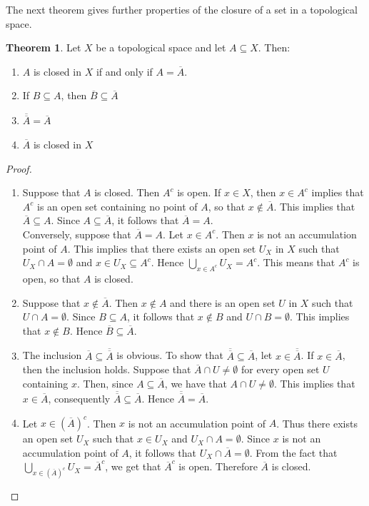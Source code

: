 \documentclass[11pt,a4paper]{article}
\theoremstyle{definition}
\newtheorem{thm}{Theorem}[subsection]
\begin{document}
The next theorem gives further properties of the closure of a set in a topological space.




\begin{thm}
Let $X$ be a topological space and let $A\subseteq X$. Then:
\begin{enumerate}
\item[a.] $A$ is closed in $X$ if and only if $A=\overline{A}$.
\item[b.] If $B\subseteq A$, then $\overline{B}\subseteq \overline{A}$
\item[c.] $\overline{\overline{A}}=\overline{A}$
\item[d.] $\overline{A}$ is closed in $X$
\end{enumerate}
\end{thm}


\begin{proof}
\begin{enumerate}
\item[a.] Suppose that $A$ is closed. Then $A^c$ is open. If $x\in X$, then $x\in A^c$ implies that $A^c$ is an open set containing no point of $A$, so that $x\not\in \overline{A}$. This implies that $\overline{A}\subseteq A$. Since $A\subseteq \overline{A}$, it follows that $\overline{A}=A$.\\ 
Conversely, suppose that $\overline{A}=A$. Let $x\in A^c$. Then $x$ is not an accumulation point of $A$. This implies that there exists an open set $U_X$ in $X$ such that $U_X\cap A=\emptyset$ and $x\in U_X\subseteq A^c$. Hence $\bigcup_{x\in A^c}U_X=A^c$. This means that $A^c$ is open, so that $A$ is closed.

\item[b.] Suppose that $x\not\in \overline{A}$. Then $x\not\in A$ and there is an open set $U$ in $X$ such that $U\cap A=\emptyset$. Since $B\subseteq A$, it follows that $x\not \in B$ and $U\cap B=\emptyset$. This implies that $x\not\in B$. Hence $\overline{B}\subseteq \overline{A}$.

\item[c.] The inclusion $\overline{A}\subseteq \overline{\overline{A}}$ is obvious. To show that $\overline{\overline{A}}\subseteq \overline{A}$, let $x\in \overline{\overline{A}}$. If $x\in \overline{A}$, then the inclusion holds. Suppose that $\overline{A}\cap U\neq \emptyset$ for every open set $U$ containing $x$. Then, since $A\subseteq \overline{A}$, we have that $A\cap U\neq \emptyset$. This implies that $x\in \overline{A}$, consequently $\overline{\overline{A}}\subseteq \overline{A}$. Hence $\overline{\overline{A}}=\overline{A}$.

\item[d.] Let $x\in (\overline{A})^c$. Then $x$ is not an accumulation point of $A$. Thus there exists an open set $U_X$ such that $x\in U_X$ and $U_X\cap A=\emptyset$. Since $x$ is not an accumulation point of $A$, it follows that $U_X\cap \overline{A}=\emptyset$. From the fact that $\bigcup_{x\in (\overline{A})^c} U_X=\overline{A}^c$, we get that $\overline{A}^c$ is open. Therefore $\overline{A}$ is closed.
\end{enumerate} 
\end{proof}
\end{document}
